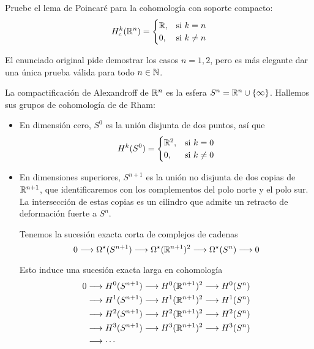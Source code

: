 \begin{exercise}
Pruebe el lema de Poincaré para la cohomología con soporte compacto:
$$
H_c^k(\mathbb R^n) =
    \begin{cases}
        \mathbb R, & \text{si } k = n \\
        0, & \text{si } k \ne n
    \end{cases}
$$
\end{exercise}

\begin{remark}
El enunciado original pide demostrar los casos $n = 1,2$, pero es más elegante dar una única prueba válida para todo $n \in \mathbb N$.
\end{remark}

\begin{solution}
La compactificación de Alexandroff de $\mathbb R^n$ es la esfera $S^n = \mathbb R^n \cup \{ \infty \}$. Hallemos sus grupos de cohomología de de Rham:
\begin{itemize}
    \item En dimensión cero, $S^0$ es la unión disjunta de dos puntos, así que
    $$
    H^k(S^0) =
        \begin{cases}
            \mathbb R^2, & \text{si } k = 0 \\
            0, & \text{si } k \ne 0
        \end{cases}
    $$
    
    \item En dimensiones superiores, $S^{n+1}$ es la unión no disjunta de dos copias de $\mathbb R^{n+1}$, que identificaremos con los complementos del polo norte y el polo sur. La intersección de estas copias es un cilindro que admite un retracto de deformación fuerte a $S^n$.
    
    Tenemos la sucesión exacta corta de complejos de cadenas
    $$
    0
        \longrightarrow \Omega^\star(S^{n+1})
        \longrightarrow \Omega^\star(\mathbb R^{n+1})^2
        \longrightarrow \Omega^\star(S^n)
        \longrightarrow 0
    $$
    
    Esto induce una sucesión exacta larga en cohomología
    \begin{align*}
    0 & \longrightarrow H^0(S^{n+1}) \longrightarrow H^0(\mathbb R^{n+1})^2 \longrightarrow H^0(S^n) \\
      & \longrightarrow H^1(S^{n+1}) \longrightarrow H^1(\mathbb R^{n+1})^2 \longrightarrow H^1(S^n) \\
      & \longrightarrow H^2(S^{n+1}) \longrightarrow H^2(\mathbb R^{n+1})^2 \longrightarrow H^2(S^n) \\
      & \longrightarrow H^3(S^{n+1}) \longrightarrow H^3(\mathbb R^{n+1})^2 \longrightarrow H^3(S^n) \\
      & \longrightarrow \cdots
    \end{align*}
    

\end{itemize}
\end{solution}
